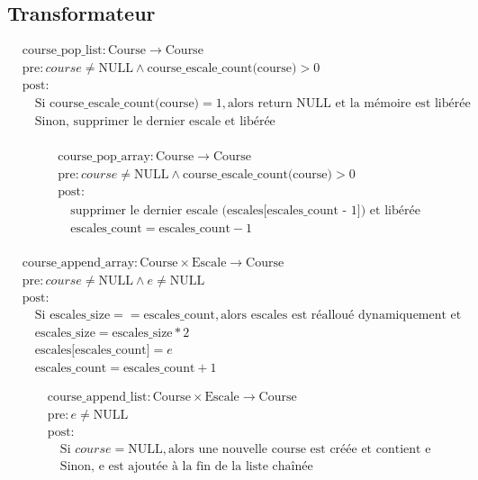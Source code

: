 \subsection{Transformateur}

\[
\begin{aligned}
&\text{course\_pop\_list}: \text{Course} \to \text{Course} \\
&\text{pre}: course \neq \text{NULL} \land \text{course\_escale\_count(course)} > 0\\
&\text{post}: \\
&\quad \text{Si course\_escale\_count(course)} = 1, \text{alors } \text{return NULL} \text{ et la mémoire est libérée} \\
&\quad \text{Sinon, } \text{supprimer le dernier escale et libérée} \\
\end{aligned}
\]

\[
\begin{aligned}
&\text{course\_pop\_array}: \text{Course} \to \text{Course} \\
&\text{pre}: course \neq \text{NULL} \land \text{course\_escale\_count(course)} > 0 \\
&\text{post}: \\
&\quad \text{supprimer le dernier escale (escales[escales\_count - 1]) et libérée} \\
&\quad \text{escales\_count} = \text{escales\_count} - 1 \\
\end{aligned}
\]


\[
\begin{aligned}
&\text{course\_append\_array}: \text{Course} \times \text{Escale} \to \text{Course} \\
&\text{pre}: course \neq \text{NULL} \land e \neq \text{NULL} \\
&\text{post}: \\
&\quad \text{Si } \text{escales\_size} == \text{escales\_count}, \text{alors escales est réalloué dynamiquement et} \\
&\quad \text{escales\_size} = \text{escales\_size} * 2 \\
&\quad \text{escales[escales\_count]} = e \\
&\quad \text{escales\_count} = \text{escales\_count} + 1
\end{aligned}
\]


\[
\begin{aligned}
&\text{course\_append\_list}: \text{Course} \times \text{Escale} \to \text{Course} \\
&\text{pre}: e \neq \text{NULL} \\
&\text{post}: \\
&\quad \text{Si } course = \text{NULL}, \text{alors une nouvelle course est créée et contient e} \\
&\quad \text{Sinon, e est ajoutée à la fin de la liste chaînée} \\
\end{aligned}
\]

